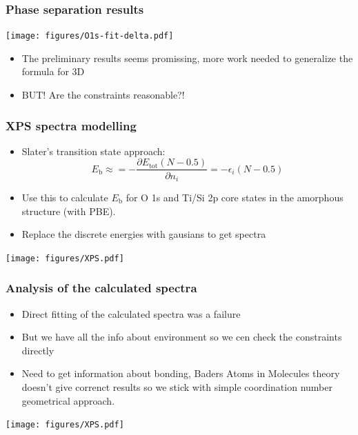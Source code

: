 \documentclass[noamsthm,8pt,t,xcolor={dvipsnames}]{beamer}
\begin{document}
\begin{frame}
   \frametitle{Phase separation results}
   \vspace{-0.3cm}
   \begin{center}
      \texttt{[image: figures/O1s-fit-delta.pdf]}
   \end{center}
   \begin{itemize}
      \item The preliminary results seems promissing, more work needed to generalize the formula for 3D
      \item BUT! Are the constraints reasonable?! 
   \end{itemize}
\end{frame}

\begin{frame}
   \frametitle{XPS spectra modelling}
   \vspace{-0.3cm}
   \begin{itemize}
      \item Slater's transition state approach: $$E_\mathrm{b} \approx = -\frac{ \partial E_\mathrm{tot}(N − 0.5)} { \partial n_i} = −\epsilon_i(N − 0.5)$$
      \item Use this to calculate $E_\mathrm{b}$ for O 1s and Ti/Si 2p core states in the amorphous structure (with PBE).
      \item Replace the discrete energies with gausians to get spectra
   \end{itemize}
   \begin{center}
      \texttt{[image: figures/XPS.pdf]}
   \end{center}
\end{frame}

\begin{frame}
   \frametitle{Analysis of the calculated spectra}
   \vspace{-0.3cm}
   \begin{itemize}
      \item Direct fitting of the calculated spectra was a failure
      \item But we have all the info about environment so we cen check the constraints directly
      \item Need to get information about bonding, Baders Atoms in Molecules theory doesn't give correnct results so we stick with simple coordination number geometrical approach.
   \end{itemize}
   \begin{center}
      \texttt{[image: figures/XPS.pdf]}
   \end{center}
\end{frame}
\end{document}
